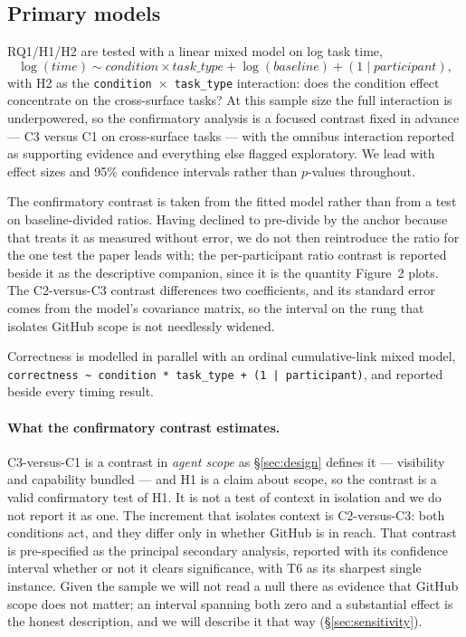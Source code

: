 \documentclass[acmsmall,review,screen]{acmart}
\newcommand{\code}[1]{\texttt{#1}}
\begin{document}
\subsection{Primary models}\label{sec:models}

RQ1/H1/H2 are tested with a linear mixed model on log task time,
\[
\log(\mathit{time}) \sim \mathit{condition} \times \mathit{task\_type}
  + \log(\mathit{baseline}) + (1 \mid \mathit{participant}),
\]
with H2 as the \code{condition}~$\times$~\code{task\_type} interaction: does the
condition effect concentrate on the cross-surface tasks? At this sample size the
full interaction is underpowered, so the confirmatory analysis is a
focused contrast fixed in advance --- C3 versus C1 on cross-surface tasks --- with
the omnibus interaction reported as supporting evidence and everything else
flagged exploratory. We lead with effect sizes and 95\% confidence intervals
rather than $p$-values throughout.

The confirmatory contrast is taken from the fitted model rather than from a test
on baseline-divided ratios. Having declined to pre-divide by the anchor because
that treats it as measured without error, we do not then reintroduce the ratio
for the one test the paper leads with; the per-participant ratio contrast is
reported beside it as the descriptive companion, since it is the quantity
Figure~2 plots. The C2-versus-C3 contrast differences two
coefficients, and its standard error comes from the model's covariance matrix, so
the interval on the rung that isolates GitHub scope is not needlessly widened.

Correctness is modelled in parallel with an ordinal cumulative-link mixed model,
\code{correctness \textasciitilde{} condition * task\_type + (1 | participant)},
and reported beside every timing result.

\paragraph{What the confirmatory contrast estimates.} C3-versus-C1 is a contrast
in \emph{agent scope} as \S\ref{sec:design} defines it --- visibility and
capability bundled --- and H1 is a claim about scope, so the contrast is a valid
confirmatory test of H1. It is not a test of context in isolation and we do not
report it as one. The increment that isolates context is C2-versus-C3: both
conditions act, and they differ only in whether GitHub is in reach. That contrast
is pre-specified as the principal secondary analysis, reported with its
confidence interval whether or not it clears significance, with T6 as its
sharpest single instance. Given the sample we will not read a null there as
evidence that GitHub scope does not matter; an interval spanning both zero and a
substantial effect is the honest description, and we will describe it that way
(\S\ref{sec:sensitivity}).
\end{document}
